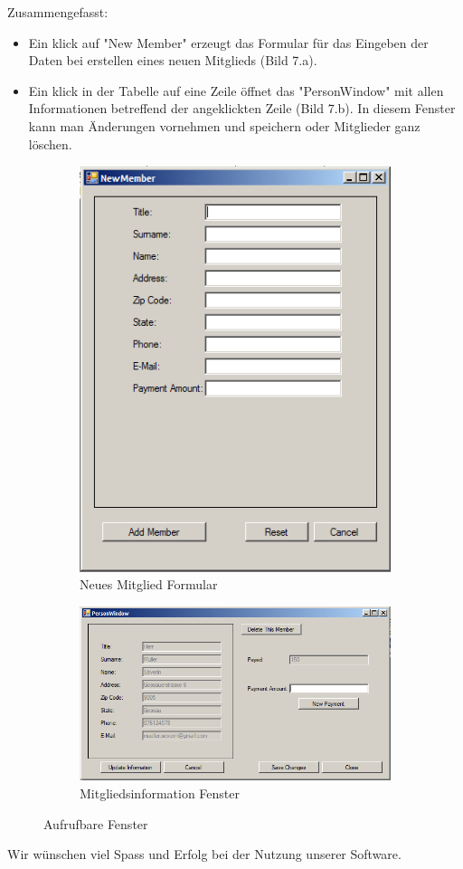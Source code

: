 \documentclass{article}
\begin{document}
Zusammengefasst: 
\begin{itemize}
\item Ein klick auf "New Member" erzeugt das Formular für das Eingeben der Daten bei erstellen eines neuen Mitglieds (Bild 7.a).
 
\item Ein klick in der Tabelle auf eine Zeile öffnet das "PersonWindow" mit allen Informationen betreffend der angeklickten Zeile (Bild 7.b). In diesem Fenster kann man Änderungen vornehmen und speichern oder Mitglieder ganz löschen.
\end{itemize}

 \begin{figure}[h]
 	\centering
 	\begin{subfigure}{.4\textwidth}
 		\centering
 		\includegraphics[width=.7\linewidth]{NewMemberGui}
 		\caption{Neues Mitglied Formular}
 		\label{fig:sub1}
 	\end{subfigure}%
 	\begin{subfigure}{.5\textwidth}
 		\centering
 		\includegraphics[width=.9\linewidth]{MemberInfoGUI}
 		\caption{Mitgliedsinformation Fenster}
 		\label{fig:sub2}
 	\end{subfigure}
 	\caption{Aufrufbare Fenster}
 	\label{fig:test}
 \end{figure}
 
 \centering \large Wir wünschen viel Spass und Erfolg bei der Nutzung unserer Software. 
\end{document}
